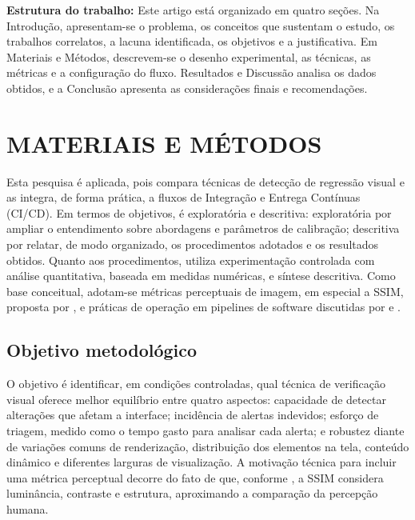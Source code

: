 \documentclass{UNESC}
\begin{document}
\vspace{0.5em}
\noindent
\textbf{Estrutura do trabalho:} Este artigo está organizado em quatro seções. Na Introdução, apresentam-se o problema, os conceitos que sustentam o estudo, os trabalhos correlatos, a lacuna identificada, os objetivos e a justificativa. Em Materiais e Métodos, descrevem-se o desenho experimental, as técnicas, as métricas e a configuração do fluxo. Resultados e Discussão analisa os dados obtidos, e a Conclusão apresenta as considerações finais e recomendações.


\section{MATERIAIS E MÉTODOS}

Esta pesquisa é aplicada, pois compara técnicas de detecção de regressão visual e as integra, de forma prática, a fluxos de Integração e Entrega Contínuas (CI/CD). Em termos de objetivos, é exploratória e descritiva: exploratória por ampliar o entendimento sobre abordagens e parâmetros de calibração; descritiva por relatar, de modo organizado, os procedimentos adotados e os resultados obtidos. Quanto aos procedimentos, utiliza experimentação controlada com análise quantitativa, baseada em medidas numéricas, e síntese descritiva. Como base conceitual, adotam-se métricas perceptuais de imagem, em especial a SSIM, proposta por , e práticas de operação em pipelines de software discutidas por  e .

\subsection{Objetivo metodológico}
O objetivo é identificar, em condições controladas, qual técnica de verificação visual oferece melhor equilíbrio entre quatro aspectos: capacidade de detectar alterações que afetam a interface; incidência de alertas indevidos; esforço de triagem, medido como o tempo gasto para analisar cada alerta; e robustez diante de variações comuns de renderização, distribuição dos elementos na tela, conteúdo dinâmico e diferentes larguras de visualização. A motivação técnica para incluir uma métrica perceptual decorre do fato de que, conforme , a SSIM considera luminância, contraste e estrutura, aproximando a comparação da percepção humana.
\end{document}
